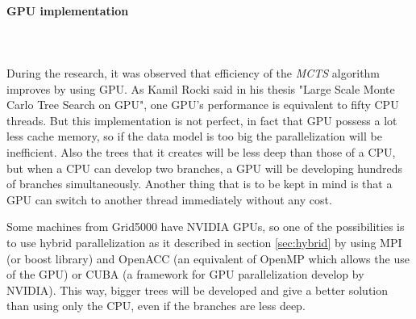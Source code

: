 \paragraph{GPU implementation}\mbox{}\\\mbox{}\\

During the research, it was observed that efficiency of the \emph{MCTS} algorithm improves by using GPU. As Kamil Rocki said in his thesis "Large Scale Monte Carlo Tree Search on GPU"\cite{GPU}, one GPU's performance is equivalent to fifty CPU threads. But this implementation is not perfect, in fact that GPU possess a lot less cache memory, so if the data model is too big the parallelization will be inefficient. Also the trees that it creates will be less deep than those of a CPU, but when a CPU can develop two branches, a GPU will be developing hundreds of branches simultaneously. Another thing that is to be kept in mind is that a GPU can switch to another thread immediately without any cost. 

Some machines from Grid5000 have NVIDIA GPUs, so one of the possibilities is to use hybrid parallelization as it described in section \ref{sec:hybrid} by using MPI (or boost library) and OpenACC (an equivalent of OpenMP which allows the use of the GPU) or CUBA (a framework for GPU parallelization develop by NVIDIA). This way, bigger trees will be developed and give a better solution than using only the CPU, even if the branches are less deep.